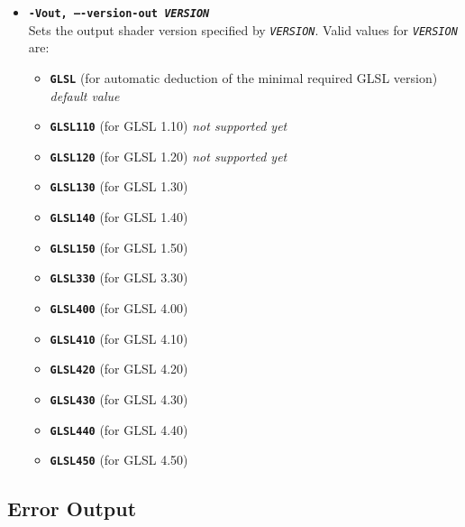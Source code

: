 \documentclass{article}
\begin{document}
\begin{itemize}
	\item[] \textbf{\texttt{-Vout, ----version-out \textit{VERSION}}} \\
	Sets the output shader version specified by \texttt{\textit{VERSION}}.
	Valid values for \texttt{\textit{VERSION}} are:
	\begin{itemize}
		\item[] \textbf{\texttt{GLSL}} (for automatic deduction of the minimal required GLSL version) \textit{default value}
		\item[] \textbf{\texttt{GLSL110}} (for GLSL 1.10) \textit{not supported yet}
		\item[] \textbf{\texttt{GLSL120}} (for GLSL 1.20) \textit{not supported yet}
		\item[] \textbf{\texttt{GLSL130}} (for GLSL 1.30)
		\item[] \textbf{\texttt{GLSL140}} (for GLSL 1.40)
		\item[] \textbf{\texttt{GLSL150}} (for GLSL 1.50)
		\item[] \textbf{\texttt{GLSL330}} (for GLSL 3.30)
		\item[] \textbf{\texttt{GLSL400}} (for GLSL 4.00)
		\item[] \textbf{\texttt{GLSL410}} (for GLSL 4.10)
		\item[] \textbf{\texttt{GLSL420}} (for GLSL 4.20)
		\item[] \textbf{\texttt{GLSL430}} (for GLSL 4.30)
		\item[] \textbf{\texttt{GLSL440}} (for GLSL 4.40)
		\item[] \textbf{\texttt{GLSL450}} (for GLSL 4.50)
	\end{itemize}
	
\end{itemize}

\subsection{Error Output}
\end{document}
